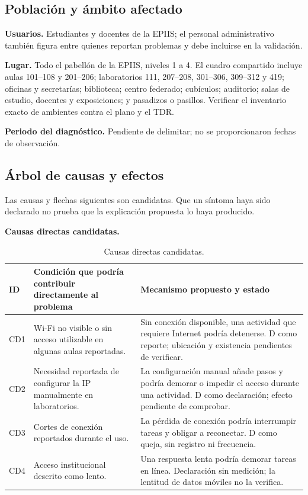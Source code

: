 \subsection{Población y ámbito afectado}

	\textbf{Usuarios.} Estudiantes y docentes de la EPIIS; el personal administrativo también figura entre quienes reportan problemas y debe incluirse en la validación.

	\textbf{Lugar.} Todo el pabellón de la EPIIS, niveles 1 a 4. El cuadro compartido incluye aulas 101--108 y 201--206; laboratorios 111, 207--208, 301--306, 309--312 y 419; oficinas y secretarías; biblioteca; centro federado; cubículos; auditorio; salas de estudio, docentes y exposiciones; y pasadizos o pasillos. Verificar el inventario exacto de ambientes contra el plano y el TDR.

	\textbf{Periodo del diagnóstico.} Pendiente de delimitar; no se proporcionaron fechas de observación.

\subsection{Árbol de causas y efectos}

	Las causas y flechas siguientes son candidatas. Que un síntoma haya sido declarado no prueba que la explicación propuesta lo haya producido.

	\textbf{Causas directas candidatas.}

	\begin{table}[H]
		\centering
		\caption{Causas directas candidatas.}
		\begin{tabular}{C{1.2cm}T{4.5cm}T{8.8cm}}
			\hline
			\textbf{ID} & \textbf{Condición que podría contribuir directamente al problema} & \textbf{Mecanismo propuesto y estado} \bigstrut\\
			\hline
			CD1 & Wi-Fi no visible o sin acceso utilizable en algunas aulas reportadas. & Sin conexión disponible, una actividad que requiere Internet podría detenerse. D como reporte; ubicación y existencia pendientes de verificar. \\
			CD2 & Necesidad reportada de configurar la IP manualmente en laboratorios. & La configuración manual añade pasos y podría demorar o impedir el acceso durante una actividad. D como declaración; efecto pendiente de comprobar. \\
			CD3 & Cortes de conexión reportados durante el uso. & La pérdida de conexión podría interrumpir tareas y obligar a reconectar. D como queja, sin registro ni frecuencia. \\
			CD4 & Acceso institucional descrito como lento. & Una respuesta lenta podría demorar tareas en línea. Declaración sin medición; la lentitud de datos móviles no la verifica. \\
			\hline
		\end{tabular}
		\label{tab:causas-directas}
	\end{table}

